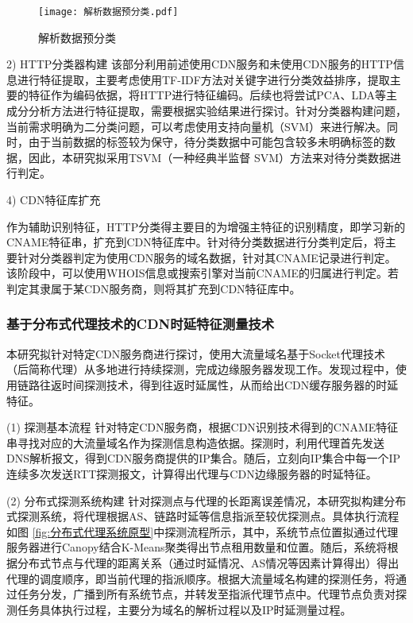 \begin{figure}[ht]
	\centering
	\texttt{[image: 解析数据预分类.pdf]}
	\caption{解析数据预分类}
	\label{fig:解析数据预分类}
\end{figure}
\FloatBarrier

2) HTTP分类器构建
该部分利用前述使用CDN服务和未使用CDN服务的HTTP信息进行特征提取，主要考虑使用TF-IDF方法对关键字进行分类效益排序，提取主要的特征作为编码依据，将HTTP进行特征编码。后续也将尝试PCA、LDA等主成分分析方法进行特征提取，需要根据实验结果进行探讨。针对分类器构建问题，当前需求明确为二分类问题，可以考虑使用支持向量机（SVM）来进行解决。同时，由于当前数据的标签较为保守，待分类数据中可能包含较多未明确标签的数据，因此，本研究拟采用TSVM\cite{Joachims1999}（一种经典半监督 SVM）方法来对待分类数据进行判定。


4) CDN特征库扩充

作为辅助识别特征，HTTP分类得主要目的为增强主特征的识别精度，即学习新的CNAME特征串，扩充到CDN特征库中。针对待分类数据进行分类判定后，将主要针对分类器判定为使用CDN服务的域名数据，针对其CNAME记录进行判定。该阶段中，可以使用WHOIS信息或搜索引擎对当前CNAME的归属进行判定。若判定其隶属于某CDN服务商，则将其扩充到CDN特征库中。
 
\subsubsection{基于分布式代理技术的CDN时延特征测量技术}
本研究拟针对特定CDN服务商进行探讨，使用大流量域名基于Socket代理技术（后简称代理）从多地进行持续探测，完成边缘服务器发现工作。发现过程中，使用链路往返时间探测技术，得到往返时延属性，从而给出CDN缓存服务器的时延特征。

(1) 探测基本流程
针对特定CDN服务商，根据CDN识别技术得到的CNAME特征串寻找对应的大流量域名作为探测信息构造依据。探测时，利用代理首先发送DNS解析报文，得到CDN服务商提供的IP集合。随后，立刻向IP集合中每一个IP连续多次发送RTT探测报文，计算得出代理与CDN边缘服务器的时延特征。


(2) 分布式探测系统构建 
针对探测点与代理的长距离误差情况，本研究拟构建分布式探测系统，将代理根据AS、链路时延等信息指派至较优探测点。具体执行流程如图 \ref{fig:分布式代理系统原型}中探测流程所示，其中，系统节点位置拟通过代理服务器进行Canopy结合K-Means聚类得出节点租用数量和位置。随后，系统将根据分布式节点与代理的距离关系（通过时延情况、AS情况等因素计算得出）得出代理的调度顺序，即当前代理的指派顺序。根据大流量域名构建的探测任务，将通过任务分发，广播到所有系统节点，并转发至指派代理节点中。代理节点负责对探测任务具体执行过程，主要分为域名的解析过程以及IP时延测量过程。

